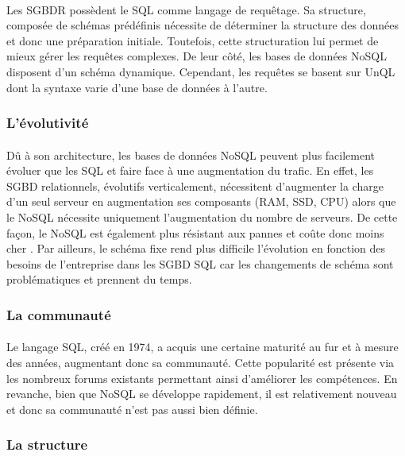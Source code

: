 \paragraph{}Les SGBDR possèdent le SQL comme langage de requêtage. Sa structure, composée de schémas prédéfinis nécessite de déterminer la structure des données et donc une préparation initiale. Toutefois, cette structuration lui permet de mieux gérer les requêtes complexes. De leur côté, les bases de données NoSQL disposent d’un schéma dynamique. Cependant, les requêtes se basent sur  \gls{UnQL} dont la syntaxe varie d'une base de données à l'autre.

\subsubsection{L’évolutivité}

\paragraph{}Dû à son architecture, les bases de données NoSQL peuvent plus facilement évoluer que les SQL et faire face à une augmentation du trafic. En effet, les SGBD relationnels, évolutifs verticalement, nécessitent d’augmenter la charge d’un seul serveur en augmentation ses composants (RAM, SSD, CPU) alors que le NoSQL nécessite uniquement l’augmentation du nombre de serveurs. De cette façon, le NoSQL est également plus résistant aux pannes et coûte donc moins cher \supercite{costNoSQL}. Par ailleurs, le schéma fixe rend plus difficile l’évolution en fonction des besoins de l’entreprise dans les SGBD SQL car les changements de schéma sont problématiques et prennent du temps.

\subsubsection{La communauté}
\paragraph{}Le langage SQL, créé en 1974, a acquis une certaine maturité au fur et à mesure des années, augmentant donc sa communauté. Cette popularité est présente via les nombreux forums existants permettant ainsi d’améliorer les compétences. En revanche, bien que NoSQL se développe rapidement, il est relativement nouveau et donc sa communauté n’est pas aussi bien définie.

\subsubsection{La structure}
